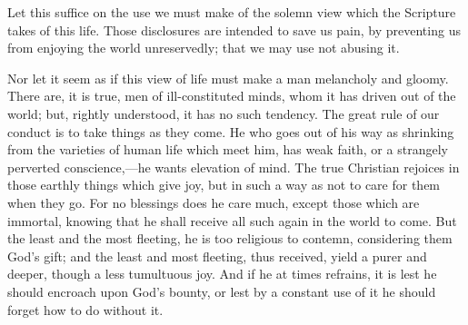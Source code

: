 Let this suffice on the use we must make of the solemn
view which the Scripture takes of this life. Those
disclosures are intended to save us pain, by preventing
us from enjoying the world unreservedly; that we may use
not abusing it.

Nor let it seem as if this view of life must make a
man melancholy and gloomy. There are, it is true, men of
ill-constituted minds, whom it has driven out of the
world; but, rightly understood, it has no such tendency.
The great rule of our conduct is to take things as they
come. He who goes out of his way as shrinking from the
varieties of human life which meet him, has weak faith,
or a strangely perverted conscience,—he wants
elevation of mind. The true Christian rejoices in those
earthly things which give joy, but in such a way as not
to care for them when they go. For no blessings does he
care much, except those which are immortal, knowing that
he shall receive all such again in the world to come. But
the least and the most fleeting, he is too religious to
contemn, considering them God's gift; and the least and
most fleeting, thus received, yield a purer and deeper,
though a less tumultuous joy. And if he at times
refrains, it is lest he should encroach upon God's
bounty, or lest by a constant use of it he should forget
how to do without it.

